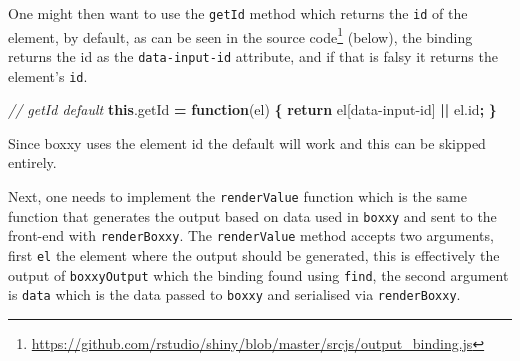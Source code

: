 \documentclass[
]{krantz}
\makeatletter
\newenvironment{Shaded}{\begin{snugshade}}{\end{snugshade}}
\newcommand{\AttributeTok}[1]{\textcolor[rgb]{0.61,0.61,0.61}{#1}}
\newcommand{\CommentTok}[1]{\textcolor[rgb]{0.37,0.37,0.37}{\textit{#1}}}
\newcommand{\ControlFlowTok}[1]{\textcolor[rgb]{0.27,0.27,0.27}{\textbf{#1}}}
\newcommand{\DataTypeTok}[1]{\textcolor[rgb]{0.27,0.27,0.27}{#1}}
\newcommand{\KeywordTok}[1]{\textcolor[rgb]{0.27,0.27,0.27}{\textbf{#1}}}
\newcommand{\NormalTok}[1]{#1}
\newcommand{\OperatorTok}[1]{\textcolor[rgb]{0.43,0.43,0.43}{\textbf{#1}}}
\newcommand{\StringTok}[1]{\textcolor[rgb]{0.5,0.5,0.5}{#1}}
\newcommand{\VariableTok}[1]{\textcolor[rgb]{0,0,0}{#1}}
\renewcommand{\href}[2]{#2\footnote{\url{#1}}}
\newenvironment{kframe}{%
\medskip{}
\setlength{\fboxsep}{.8em}
 \def\at@end@of@kframe{}%
 \ifinner\ifhmode%
  \def\at@end@of@kframe{\end{minipage}}%
  \begin{minipage}{\columnwidth}%
 \fi\fi%
 \def\FrameCommand##1{\hskip\@totalleftmargin \hskip-\fboxsep
 \colorbox{shadecolor}{##1}\hskip-\fboxsep
     \hskip-\linewidth \hskip-\@totalleftmargin \hskip\columnwidth}%
 \MakeFramed {\advance\hsize-\width
   \@totalleftmargin\z@ \linewidth\hsize
   \@setminipage}}%
 {\par\unskip\endMakeFramed%
 \at@end@of@kframe}
\renewenvironment{Shaded}{\begin{kframe}}{\end{kframe}}
\makeatother
\begin{document}
\begin{Shaded}
\end{Shaded}

One might then want to use the \texttt{getId} method which returns the \texttt{id} of the element, by default, as can be seen in the \href{https://github.com/rstudio/shiny/blob/master/srcjs/output_binding.js}{source code} (below), the binding returns the id as the \texttt{data-input-id} attribute, and if that is falsy it returns the element's \texttt{id}.

\begin{Shaded}
\begin{Highlighting}[]
\CommentTok{// getId default}
\KeywordTok{this}\NormalTok{.}\AttributeTok{getId} \OperatorTok{=} \KeywordTok{function}\NormalTok{(el) }\OperatorTok{\{}
  \ControlFlowTok{return}\NormalTok{ el[}\StringTok{\textquotesingle{}data{-}input{-}id\textquotesingle{}}\NormalTok{] }\OperatorTok{||} \VariableTok{el}\NormalTok{.}\AttributeTok{id}\OperatorTok{;}
\OperatorTok{\}}
\end{Highlighting}
\end{Shaded}

Since boxxy uses the element id the default will work and this can be skipped entirely.

Next, one needs to implement the \texttt{renderValue} function which is the same function that generates the output based on data used in \texttt{boxxy} and sent to the front-end with \texttt{renderBoxxy}. The \texttt{renderValue} method accepts two arguments, first \texttt{el} the element where the output should be generated, this is effectively the output of \texttt{boxxyOutput} which the binding found using \texttt{find}, the second argument is \texttt{data} which is the data passed to \texttt{boxxy} and serialised via \texttt{renderBoxxy}.
\end{document}
